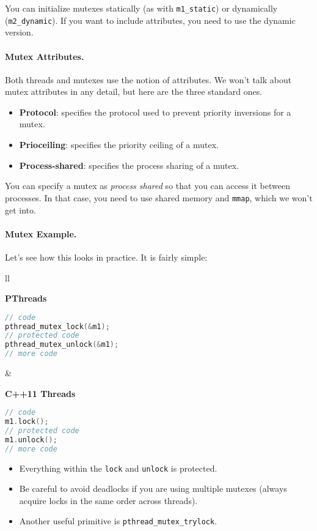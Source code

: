 You can initialize mutexes statically (as with {\tt m1\_static}) or
dynamically ({\tt m2\_dynamic}). If you want to include attributes,
you need to use the dynamic version.

\paragraph{Mutex Attributes.} Both threads and mutexes use the notion of attributes.
We won't talk about mutex attributes in any detail, but here are the three standard ones.
  \begin{itemize}
    \item {\bf Protocol}: specifies the protocol used to prevent priority
      inversions for a mutex.
    \item {\bf Prioceiling}: specifies the priority ceiling of a mutex.
    \item {\bf Process-shared}: specifies the process sharing of a mutex.
  \end{itemize}
  You can specify a mutex as {\it process shared} so that you can access it
  between processes. In that case, you need to use shared memory and {\tt mmap},
  which we won't get into.

  \paragraph{Mutex Example.} Let's see how this looks in practice. It is fairly simple:
  
    \begin{tabular}{ll}
      \begin{minipage}{.5\textwidth}
        {\bf PThreads}
  \begin{lstlisting}[language=C]
// code
pthread_mutex_lock(&m1);
// protected code
pthread_mutex_unlock(&m1);
// more code
  \end{lstlisting}
      \end{minipage}&
      \begin{minipage}{.35\textwidth}
        {\bf C++11 Threads}
  \begin{lstlisting}[language=C]
// code
m1.lock();
// protected code
m1.unlock();
// more code
  \end{lstlisting}
      \end{minipage}
    \end{tabular}
  \begin{itemize}
    \item Everything within the {\tt lock} and {\tt unlock} is protected.
    \item Be careful to avoid deadlocks if you are using multiple mutexes (always
acquire locks in the same order across threads).
    \item Another useful primitive is {\tt pthread\_mutex\_trylock}.
  \end{itemize}

